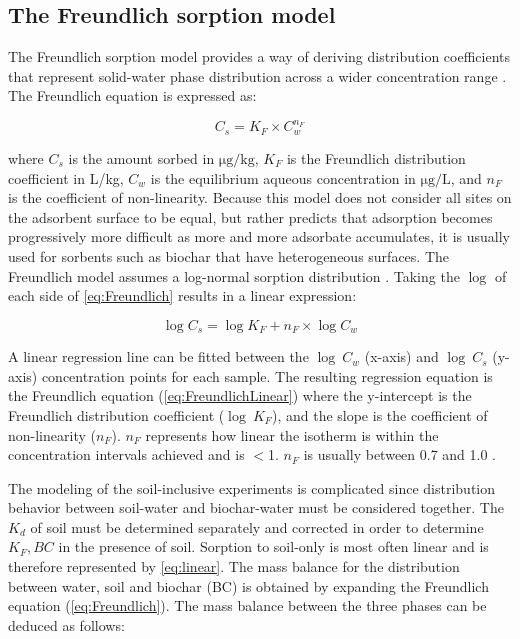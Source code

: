 \subsection{The Freundlich sorption model \label{sec:soilattenuation}}
The Freundlich sorption model provides a way of deriving distribution coefficients that represent solid-water phase distribution across a wider concentration range \citep{zhang2013sorption}. The Freundlich equation is expressed as:

\begin{equation} \label{eq:Freundlich}
    C_s = K_F \times C_{w}^{n_F}
\end{equation}

where $C_s$ is the amount sorbed in $\mathrm{\mu g/kg}$, $K_F$ is the Freundlich distribution coefficient in L/kg, $C_{w}$ is the equilibrium aqueous concentration in $\mathrm{\mu g/L}$, and $n_F$ is the coefficient of non-linearity. Because this model does not consider all sites on the adsorbent surface to be equal, but rather predicts that adsorption becomes progressively more difficult as more and more adsorbate accumulates, it is usually used for sorbents such as biochar that have heterogeneous surfaces\citep{yin2022insights,schwarzenbach2005environmental}. 
The Freundlich model assumes a log-normal sorption distribution \citep{schwarzenbach2005environmental}. Taking the $\log$ of each side of \cref{eq:Freundlich} results in a linear expression:

\begin{equation} \label{eq:FreundlichLinear}
    \log C_s = \log K_F + n_F \times \log C_{w}
\end{equation}

A linear regression line can be fitted between the $\log~C_w$ (x-axis) and $\log~C_s$ (y-axis) concentration points for each sample. The resulting regression equation is the Freundlich equation (\cref{eq:FreundlichLinear}) where the y-intercept is the Freundlich distribution coefficient ($\log~K_F$), and the slope is the coefficient of non-linearity ($n_F$). $n_F$ represents how linear the isotherm is within the concentration intervals achieved and is $<$1. $n_F$ is usually between 0.7 and 1.0 \citep{Cornelissen2005}.

The modeling of the soil-inclusive experiments is complicated since distribution behavior between soil-water and biochar-water must be considered together. The $K_d$ of soil must be determined separately and corrected in order to determine $K_F,BC$ in the presence of soil. Sorption to soil-only is most often linear and is therefore represented by \cref{eq:linear}. The mass balance for the distribution between water, soil and biochar (BC) is obtained by expanding the Freundlich equation (\cref{eq:Freundlich}). The mass balance between the three phases can be deduced as follows:

